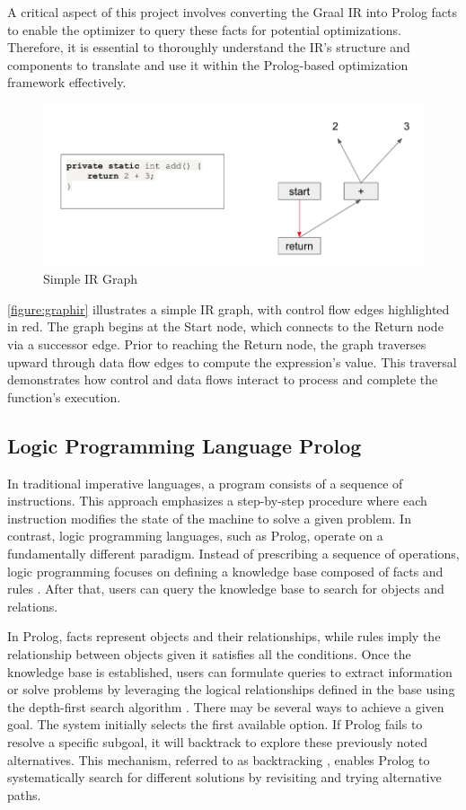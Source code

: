A critical aspect of this project involves converting the Graal IR into Prolog facts to enable the optimizer to query these facts for potential optimizations. Therefore, it is essential to thoroughly understand the IR's structure and components to translate and use it within the Prolog-based optimization framework effectively.

\begin{figure}[h]
    \centering
    \includegraphics[width=1\textwidth]{Packages/graphir.png}
    \caption{Simple IR Graph}
    \label{figure:graphir}
\end{figure}

\autoref{figure:graphir} illustrates a simple IR graph, with control flow edges highlighted in red. The graph begins at the Start node, which connects to the Return node via a successor edge. Prior to reaching the Return node, the graph traverses upward through data flow edges to compute the expression’s value. This traversal demonstrates how control and data flows interact to process and complete the function's execution.

\subsection{Logic Programming Language Prolog}

In traditional imperative languages, a program consists of a sequence of instructions. This approach emphasizes a step-by-step procedure where each instruction modifies the state of the machine to solve a given problem. In contrast, logic programming languages, such as Prolog, operate on a fundamentally different paradigm. Instead of prescribing a sequence of operations, logic programming focuses on defining a knowledge base composed of facts and rules \cite{Bramer2013}. After that, users can query the knowledge base to search for objects and relations. 

In Prolog, facts represent objects and their relationships, while rules imply the relationship between objects given it satisfies all the conditions. Once the knowledge base is established, users can formulate queries to extract information or solve problems by leveraging the logical relationships defined in the base using the depth-first search algorithm \cite{Chowdhary2020}. There may be several ways to achieve a given goal. The system initially selects the first available option. If Prolog fails to resolve a specific subgoal, it will backtrack to explore these previously noted alternatives. This mechanism, referred to as backtracking \cite{Chowdhary2020}, enables Prolog to systematically search for different solutions by revisiting and trying alternative paths.

